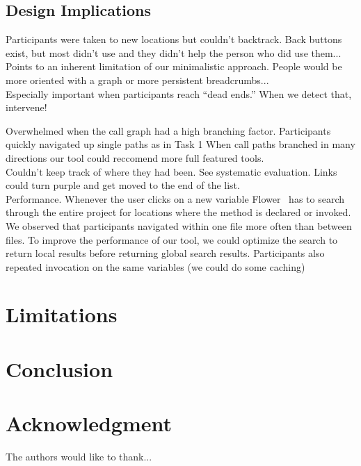 \documentclass[conference]{IEEEtran}
\newcommand{\toolName}{Flower}
\begin{document}
\subsection{Design Implications}

Participants were taken to new locations but couldn't backtrack.
	Back buttons exist, but most didn't use and they didn't help the person who did use them...
	Points to an inherent limitation of our minimalistic approach. People would be more oriented with a graph or more persistent breadcrumbs...\\
	Especially important when participants reach ``dead ends.'' When we detect that, intervene!
	
Overwhelmed when the call graph had a high branching factor.
	Participants quickly navigated up single paths as in Task 1
	When call paths branched in many directions our tool could reccomend more full featured tools.\\
Couldn't keep track of where they had been.
	See systematic evaluation. Links could turn purple and get moved to the end of the list.\\
Performance.
	Whenever the user clicks on a new variable \toolName~ has to search through the entire project for locations where the method is declared or invoked. We observed that participants navigated within one file more often than between files. To improve the performance of our tool, we could optimize the search to return local results before returning global search results.	Participants also repeated invocation on the same variables (we could do some caching)


\section{Limitations}

\section{Conclusion}

\section*{Acknowledgment}

The authors would like to thank...





\end{document}
